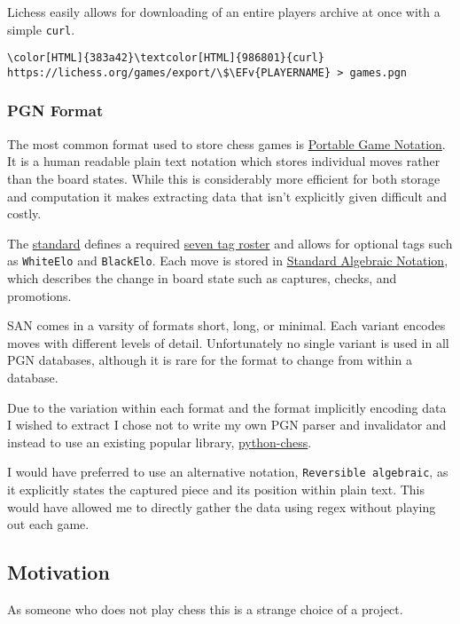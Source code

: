 \documentclass[11pt]{article}
\newcommand{\EFv}[1]{\textcolor{EFv}{#1}} %
\begin{document}
Lichess easily allows for downloading of an entire players archive at once with
a simple \texttt{curl}.
\begin{Code}
\begin{Verbatim}[]
\color[HTML]{383a42}\textcolor[HTML]{986801}{curl} https://lichess.org/games/export/\$\EFv{PLAYERNAME} > games.pgn
\end{Verbatim}
\end{Code}
\subsubsection{PGN Format}
\label{sec:org578f18a}
The most common format used to store chess games is \href{https://en.wikipedia.org/wiki/Portable\_Game\_Notation}{Portable Game Notation}. It is a human readable plain text notation which stores individual moves rather than the board states. While this is considerably more efficient for both storage and computation it makes extracting data that isn't explicitly given difficult and costly.

The \href{http://www.saremba.de/chessgml/standards/pgn/pgn-complete.htm}{standard} defines a required \href{http://www.saremba.de/chessgml/standards/pgn/pgn-complete.htm\#c8.1.1}{seven tag roster} and allows for optional tags such as \texttt{WhiteElo} and \texttt{BlackElo}. Each move is stored in \href{https://en.wikipedia.org/wiki/Algebraic\_notation\_(chess)}{Standard Algebraic Notation}, which describes the change in board state such as captures, checks, and promotions.

SAN comes in a varsity of formats short, long, or minimal. Each variant encodes moves with different levels of detail. Unfortunately no single variant is used in all PGN databases, although it is rare for the format to change from within a database.

Due to the variation within each format and the format implicitly encoding data I wished to extract I chose not to write my own PGN parser and invalidator and instead to use an existing popular library, \href{https://github.com/niklasf/python-chess}{python-chess}.

I would have preferred to use an alternative notation, \texttt{Reversible algebraic}, as it explicitly states the captured piece and its position within plain text. This would have allowed me to directly gather the data using regex without playing out each game.
\subsection{Motivation}
\label{sec:orgceed097}
As someone who does not play chess this is a strange choice of a project.
\end{document}

